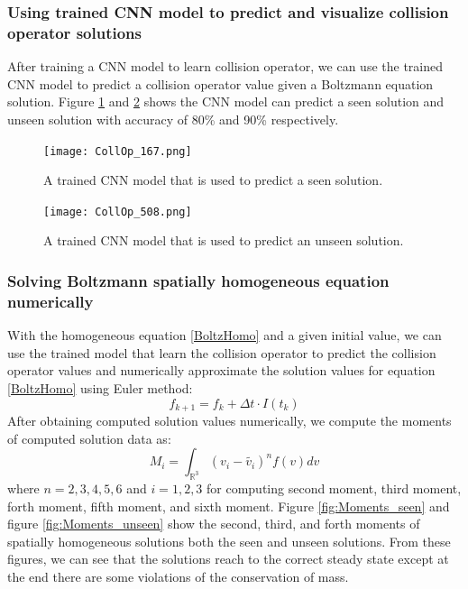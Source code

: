 \documentclass{article}
\begin{document}
\subsubsection{Using trained CNN model to predict and visualize collision operator solutions}
After training a CNN model to learn collision operator, we can use the trained CNN model to predict a collision operator value given a Boltzmann equation solution. Figure \ref{fig:CollOp_167} and \ref{fig:CollOp_508} shows the CNN model can predict a seen solution and unseen solution with accuracy of 80\% and 90\% respectively.

\begin{figure}[h]
	\centering
	\texttt{[image: CollOp\_167.png]}
	\caption{A trained CNN model that is used to predict a seen solution.}
	\label{fig:CollOp_167}
\end{figure}

\begin{figure}[h]
	\centering
	\texttt{[image: CollOp\_508.png]}
	\caption{A trained CNN model that is used to predict an unseen solution.}
	\label{fig:CollOp_508}
\end{figure}

\subsubsection{Solving Boltzmann spatially homogeneous equation numerically}
With the homogeneous equation \ref{BoltzHomo} and a given initial value, we can use  the trained model that learn the collision operator to predict the collision operator values and  numerically approximate the solution values for equation \ref{BoltzHomo} using Euler method:
\begin{equation}
f_{k+1}= f_k + \Delta t \cdot I(t_k)
\end{equation}
After obtaining computed solution values numerically, we compute the moments of computed solution data as:
\begin{equation}
M_i = \int_{\mathbb{R}^3} (v_i - \tilde{v_i})^n f(v)dv
\end{equation}
where $n=2,3,4,5,6$ and $i=1,2,3$ for computing second moment, third moment, forth moment, fifth moment, and sixth moment. Figure \ref{fig:Moments_seen} and figure \ref{fig:Moments_unseen} show the second, third, and forth moments of spatially homogeneous solutions both the seen and unseen solutions. From these figures, we can see that the solutions reach to the correct steady state except at the end there are some violations of the conservation of mass.
\end{document}
